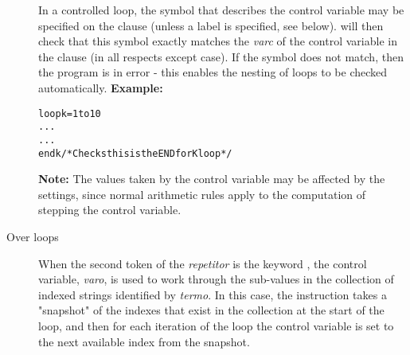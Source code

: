 \begin{description}
In a controlled loop, the symbol that describes the control variable may
be specified on the  clause (unless a label is specified,
see below).
\nr{} will then check that this symbol exactly matches the
\emph{varc} of the control variable in the  clause (in
all respects except case).
If the symbol does not match, then the program is in error - this
enables the nesting of loops to be checked automatically.
 \textbf{Example:}
\begin{alltt}
loop k=1 to 10
  ...
  ...
  end k  /* Checks this is the END for K loop */
\end{alltt}
\textbf{Note: }The values taken by the control variable may be affected by the
 settings, since normal \nr{} arithmetic rules apply
to the computation of stepping the control variable.
\item[Over loops]\label{refloopov}

When the second token of the \emph{repetitor} is the keyword
, the control variable, \emph{varo}, is used
to work through the sub-values in the collection of indexed strings
identified by \emph{termo}.
In this case, the  instruction takes a "snapshot" of
the indexes that exist in the collection at the start of the loop, and
then for each iteration of the loop the control variable is set to the
next available index from the snapshot.
 

\end{description}
